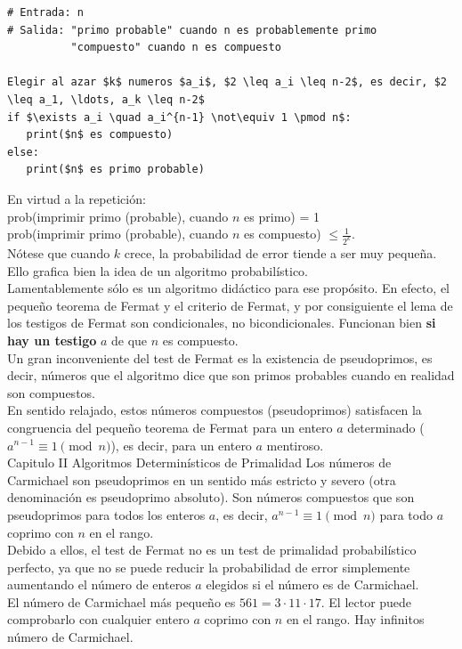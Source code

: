 \begin{lstlisting}[caption={Test de Fermat con repetición}, label={alg:Alg2Fermat}, mathescape=true]
# Entrada: n
# Salida: "primo probable" cuando n es probablemente primo
          "compuesto" cuando n es compuesto

Elegir al azar $k$ numeros $a_i$, $2 \leq a_i \leq n-2$, es decir, $2 \leq a_1, \ldots, a_k \leq n-2$
if $\exists a_i \quad a_i^{n-1} \not\equiv 1 \pmod n$:
   print($n$ es compuesto)
else:
   print($n$ es primo probable)
\end{lstlisting}

En virtud a la repetición: \\

prob(imprimir primo (probable), cuando $n$ es primo) = 1 \\
prob(imprimir primo (probable), cuando $n$ es compuesto) $\leq \frac{1}{2^k}$. \\

Nótese que cuando $k$ crece, la probabilidad de error tiende a ser muy pequeña. \\
Ello grafica bien la idea de un algoritmo probabilístico. \\
Lamentablemente sólo es un algoritmo didáctico para ese propósito. En efecto, el pequeño teorema de Fermat y el criterio de Fermat, y por consiguiente el lema de los testigos de Fermat son condicionales, no bicondicionales. Funcionan bien \textbf{si hay un testigo} $a$ de que $n$ es compuesto. \\

Un gran inconveniente del test de Fermat es la existencia de pseudoprimos, es decir, números que el algoritmo dice que son primos probables cuando en realidad son compuestos. \\
En sentido relajado, estos números compuestos (pseudoprimos) satisfacen la congruencia del pequeño teorema de Fermat para un entero $a$ determinado ($a^{n-1} \equiv 1 \pmod n$), es decir, para un entero $a$ mentiroso. \\Capitulo II Algoritmos Determinísticos de Primalidad
Los números de Carmichael son pseudoprimos en un sentido más estricto y severo (otra denominación es pseudoprimo absoluto). Son números compuestos que son pseudoprimos para todos los enteros $a$, es decir, $a^{n-1} \equiv 1 \pmod n$ para todo $a$ coprimo con $n$ en el rango. \\ 
Debido a ellos, el test de Fermat no es un test de primalidad probabilístico perfecto, ya que no se puede reducir la probabilidad de error simplemente aumentando el número de enteros $a$ elegidos si el número es de Carmichael. \\
El número de Carmichael más pequeño es $561 = 3 \cdot 11 \cdot 17$. El lector puede comprobarlo con cualquier entero $a$ coprimo con $n$ en el rango. Hay infinitos número de Carmichael. \\


